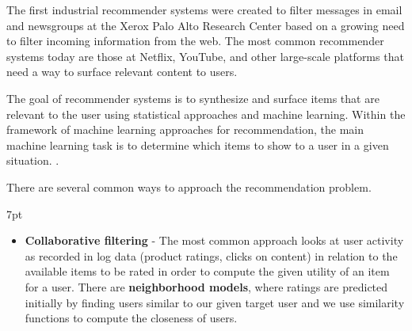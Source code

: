 \documentclass[11pt, table]{diazessay} %
\newenvironment{formal}{%
  \def\FrameCommand{%
	\hspace{1pt}%
	{\color{w_lightblue}\vrule width 2pt}%
	{\color{formalshade}\vrule width 4pt}%
	\colorbox{formalshade}%
  }%
  \MakeFramed{\advance\hsize-\width\FrameRestore}%
  \noindent\hspace{-4.55pt}%
  \begin{adjustwidth}{}{7pt}%
  \vspace{2pt}\vspace{2pt}%
}
{%
  \vspace{2pt}\end{adjustwidth}\endMakeFramed%
}
\begin{document}
\begin{sloppypar}
The first industrial recommender systems were created to filter messages in email and newsgroups\citep{goldberg1992using}  at the Xerox Palo Alto Research Center based on a growing need to filter incoming information from the web.  The most common recommender systems today are those at Netflix, YouTube, and other large-scale platforms that need a way to surface relevant content to users.

The goal of recommender systems is to synthesize and surface items that are relevant to the user using statistical approaches and machine learning. Within the framework of machine learning approaches for recommendation, the main machine learning task is to determine which items to show to a user in a given situation. \citep{castells2023recommender}.

There are several common ways to approach the recommendation problem.

\begin{formal}
\begin{itemize}

  \item \textbf{Collaborative filtering} - The most common approach looks at user activity as recorded in log data (product ratings, clicks on content) in relation to the available items to be rated in order to compute the given utility of an item for a user. There are \textbf{neighborhood models}, where ratings are predicted initially by finding users similar to our given target user and we use similarity functions to compute the closeness of users.
 

\end{itemize}
\end{formal}
\end{sloppypar}
\end{document}
